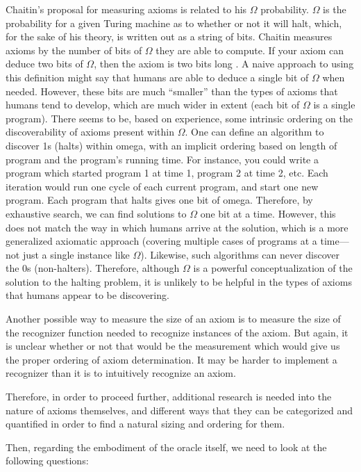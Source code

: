 Chaitin's proposal for measuring axioms is related to his $\Omega$ probability.  $\Omega$ is the probability for a given Turing machine as to whether or not it will halt, which, for the sake of his theory, is written out as a string of bits.  Chaitin measures axioms by the number of bits of $\Omega$ they are able to compute.  If your axiom can deduce two bits of $\Omega$, then the axiom is two bits long \citep{chaitin2007}.  A naive approach to using this definition might say that humans are able to deduce a single bit of $\Omega$ when needed.  However, these bits are much ``smaller'' than the types of axioms that humans tend to develop, which are much wider in extent (each bit of $\Omega$ is a single program). There seems to be, based on experience, some intrinsic ordering on the discoverability of axioms present within $\Omega$.  One can define an algorithm to discover 1s (halts) within omega, with an implicit ordering based on length of program and the program's running time.  For instance, you could write a program which started program 1 at time 1, program 2 at time 2, etc.  Each iteration would run one cycle of each current program, and start one new program.  Each program that halts gives one bit of omega.  Therefore, by exhaustive search, we can find solutions to $\Omega$ one bit at a time.  However, this does not match the way in which humans arrive at the solution, which is a more generalized axiomatic approach (covering multiple cases of programs at a time---not just a single instance like $\Omega$).  Likewise, such algorithms can never discover the 0s (non-halters).   Therefore, although $\Omega$ is a powerful conceptualization of the solution to the halting problem, it is unlikely to be helpful in the types of axioms that humans appear to be discovering.

Another possible way to measure the size of an axiom is to measure the size of the recognizer function needed to recognize instances of the axiom.  But again, it is unclear whether or not that would be the measurement which would give us the proper ordering of axiom determination.  It may be harder to implement a recognizer than it is to intuitively recognize an axiom. 

Therefore, in order to proceed further, additional research is needed into the nature of axioms themselves, and different ways that they can be categorized and quantified in order to find a natural sizing and ordering for them.

Then, regarding the embodiment of the oracle itself, we need to look at the following questions:

